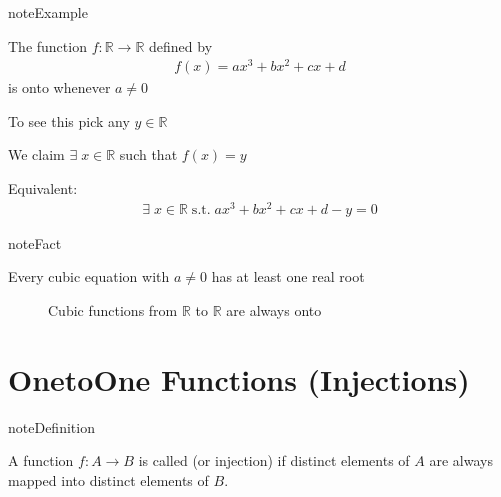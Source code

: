 \documentclass[letterpaper,10pt,english]{jupyterBook}
\begin{document}
\begin{sphinxadmonition}{note}{Example}

\sphinxAtStartPar
The function \(f \colon \mathbb{R} \to \mathbb{R}\) defined by
\begin{equation*}
\begin{split}
f(x) = ax^3 + b x^2 + cx + d
\end{split}
\end{equation*}
\sphinxAtStartPar
is onto whenever \(a \ne 0\)
\end{sphinxadmonition}

\sphinxAtStartPar
To see this pick any \(y \in \mathbb{R}\)

\sphinxAtStartPar
We claim \(\exists \; x \in \mathbb{R}\) such that \(f(x) = y\)

\sphinxAtStartPar
Equivalent:
\begin{equation*}
\begin{split}
\exists \; x \in \mathbb{R} \; \mathrm{s.t.} \;
ax^3 + b x^2 + cx + d - y = 0
\end{split}
\end{equation*}
\begin{sphinxadmonition}{note}{Fact}

\sphinxAtStartPar
Every cubic equation with \(a \ne 0\) has at least one real root
\end{sphinxadmonition}

\begin{figure}[htbp]
\centering
\capstart

\noindent{}
\caption{Cubic functions from \(\mathbb{R}\) to \(\mathbb{R}\) are always onto}\label{\detokenize{03.set_theory:cubic}}\end{figure}


\section{One\sphinxhyphen{}to\sphinxhyphen{}One Functions (Injections)}
\label{\detokenize{03.set_theory:one-to-one-functions-injections}}
\begin{sphinxadmonition}{note}{Definition}

\sphinxAtStartPar
A function \(f \colon A \to B\) is called  (or injection) if distinct
elements of \(A\) are always mapped into distinct elements of \(B\).
\end{sphinxadmonition}
\end{document}
